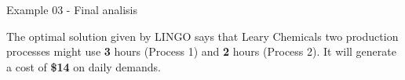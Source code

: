 \begin{frame}{Example 03 - Final analisis}

The optimal solution given by LINGO says that Leary Chemicals two production
processes might use \textbf{3} hours (Process 1) and \textbf{2} hours
(Process 2). It will generate a cost of \textbf{\$14} on daily demands.

\end{frame}
